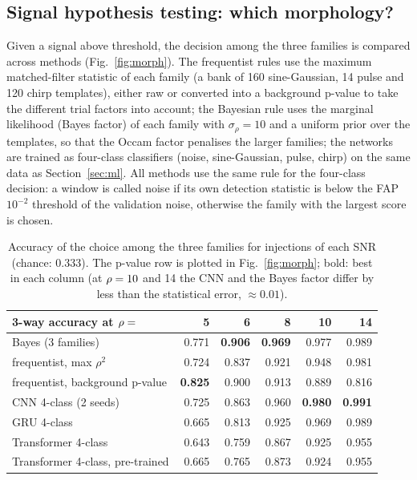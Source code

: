 \subsection{Signal hypothesis testing: which morphology?}
Given a signal above threshold, the decision among the three families is compared across methods (Fig.~\ref{fig:morph}). The frequentist rules use the maximum matched-filter statistic of each family (a bank of 160 sine-Gaussian, 14 pulse and 120 chirp templates), either raw or converted into a background p-value to take the different trial factors into account; the Bayesian rule uses the marginal likelihood (Bayes factor) of each family with $\sigma_\rho=10$ and a uniform prior over the templates, so that the Occam factor penalises the larger families; the networks are trained as four-class classifiers (noise, sine-Gaussian, pulse, chirp) on the same data as Section~\ref{sec:ml}.
All methods use the same rule for the four-class decision: a window is called noise if its own detection statistic is below the FAP $10^{-2}$ threshold of the validation noise, otherwise the family with the largest score is chosen.

\begin{table}[h]\centering\small
\begin{tabular}{lrrrrr}
\toprule
3-way accuracy at $\rho=$ & 5 & 6 & 8 & 10 & 14\\
\midrule
Bayes (3 families) & 0.771 & \textbf{0.906} & \textbf{0.969} & 0.977 & 0.989\\
frequentist, max $\rho^2$ & 0.724 & 0.837 & 0.921 & 0.948 & 0.981\\
frequentist, background p-value & \textbf{0.825} & 0.900 & 0.913 & 0.889 & 0.816\\
CNN 4-class (2 seeds) & 0.725 & 0.863 & 0.960 & \textbf{0.980} & \textbf{0.991}\\
GRU 4-class & 0.665 & 0.813 & 0.925 & 0.969 & 0.989\\
Transformer 4-class & 0.643 & 0.759 & 0.867 & 0.925 & 0.955\\
Transformer 4-class, pre-trained & 0.665 & 0.765 & 0.873 & 0.924 & 0.955\\
\bottomrule
\end{tabular}
\caption{Accuracy of the choice among the three families for injections of each SNR (chance: 0.333). The p-value row is plotted in Fig.~\ref{fig:morph}; bold: best in each column (at $\rho=10$ and 14 the CNN and the Bayes factor differ by less than the statistical error, $\approx0.01$).}\label{tab:morph}
\end{table}

